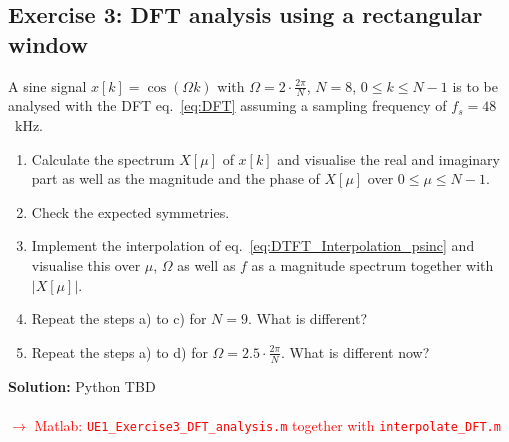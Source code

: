 \documentclass[11pt,a4paper,DIV=12]{scrartcl}
\newcommand{\red}{\textcolor{red}}
\begin{document}
\subsection*{Exercise 3: DFT analysis using a rectangular window}
A sine signal $x[k]=\cos(\Omega k)$ with $\Omega=2\cdot\frac{2\pi}{N}$, $N=8$,
$0\leq k \leq N-1$ is to be analysed with the DFT eq.~\eqref{eq:DFT} assuming a
sampling frequency of $f_s=48$~kHz.
%
\begin{enumerate}[label=\alph*)]
	\item Calculate the spectrum $X[\mu]$ of $x[k]$ and visualise the real and
	imaginary part as well as the magnitude and the phase of $X[\mu]$ over
	$0\leq\mu\leq N-1$.
%
	\item Check the expected symmetries.
%
	\item Implement the interpolation of eq.~\eqref{eq:DTFT_Interpolation_psinc}
	and visualise this over $\mu$, $\Omega$ as well as $f$ as a magnitude
	spectrum together with $|X[\mu]|$.
%
	\item Repeat the steps a) to c) for $N=9$. What is different?
%
	\item Repeat the steps a) to d) for $\Omega=2.5\cdot\frac{2\pi}{N}$.
	What is different now?
\end{enumerate}

\begin{Loesung}
\textbf{Solution:} Python TBD\\\\
\red{$\rightarrow$ Matlab: \texttt{UE1\_Exercise3\_DFT\_analysis.m}
together with \texttt{interpolate\_DFT.m}}
\end{Loesung}



\end{document}
